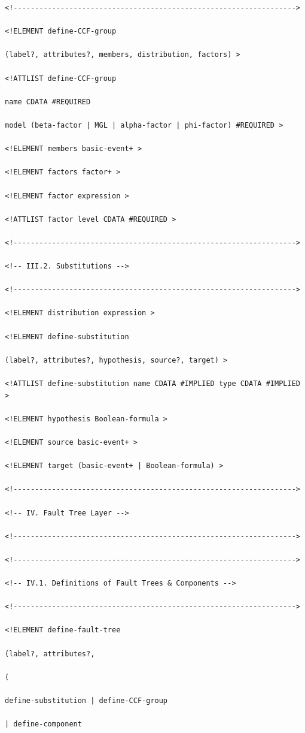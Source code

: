 \documentclass[11pt]{article}
\begin{document}
\begin{lstlisting}
<!------------------------------------------------------------------>

<!ELEMENT define-CCF-group

(label?, attributes?, members, distribution, factors) >

<!ATTLIST define-CCF-group

name CDATA #REQUIRED

model (beta-factor | MGL | alpha-factor | phi-factor) #REQUIRED >

<!ELEMENT members basic-event+ >

<!ELEMENT factors factor+ >

<!ELEMENT factor expression >

<!ATTLIST factor level CDATA #REQUIRED >

<!------------------------------------------------------------------>

<!-- III.2. Substitutions -->

<!------------------------------------------------------------------>

<!ELEMENT distribution expression >

<!ELEMENT define-substitution

(label?, attributes?, hypothesis, source?, target) >

<!ATTLIST define-substitution name CDATA #IMPLIED type CDATA #IMPLIED >

<!ELEMENT hypothesis Boolean-formula >

<!ELEMENT source basic-event+ >

<!ELEMENT target (basic-event+ | Boolean-formula) >

<!------------------------------------------------------------------>

<!-- IV. Fault Tree Layer -->

<!------------------------------------------------------------------>

<!------------------------------------------------------------------>

<!-- IV.1. Definitions of Fault Trees & Components -->

<!------------------------------------------------------------------>

<!ELEMENT define-fault-tree

(label?, attributes?,

(

define-substitution | define-CCF-group

| define-component


\end{lstlisting}
\end{document}
